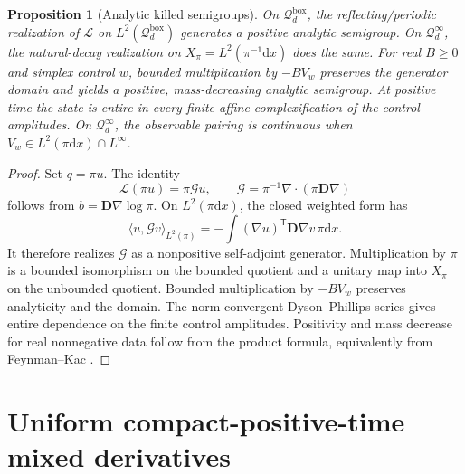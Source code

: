 \documentclass[aps,physrev,onecolumn,amsmath,amssymb,longbibliography]{revtex4-2}
\newcommand{\dd}{\mathrm d}
\newcommand{\Lfree}{\mathcal L}
\newcommand{\Qbox}{\mathcal Q_d^{\mathrm{box}}}
\newcommand{\Qinf}{\mathcal Q_d^{\infty}}
\newtheorem{proposition}[theorem]{Proposition}
\begin{document}
\begin{proposition}[Analytic killed semigroups]
\label{prop:supp-analytic}
On \(\Qbox\), the reflecting/periodic realization of \(\Lfree\) on
\(L^2(\Qbox)\) generates a positive analytic semigroup.  On \(\Qinf\), the
natural-decay realization on \(X_\pi=L^2(\pi^{-1}\dd x)\) does the same.
For real \(B\ge0\) and simplex control \(w\), bounded multiplication by
\(-BV_w\) preserves the generator domain and yields a positive,
mass-decreasing analytic semigroup.  At positive time the state is entire in
every finite affine complexification of the control amplitudes.  On
\(\Qinf\), the observable pairing is continuous when
\(V_w\in L^2(\pi\dd x)\cap L^\infty\).
\end{proposition}

\begin{proof}
Set \(q=\pi u\).  The identity
\begin{equation}
 \Lfree(\pi u)=\pi\mathcal Gu,\qquad
 \mathcal G=\pi^{-1}\nabla\!\cdot(\pi\bm D\nabla)
 \label{eq:supp-similarity}
\end{equation}
follows from \(b=\bm D\nabla\log\pi\).  On \(L^2(\pi\dd x)\), the closed
weighted form has
\begin{equation}
 \langle u,\mathcal Gv\rangle_{L^2(\pi)}
 =-\int(\nabla u)^{\mathsf T}\bm D\nabla v\,\pi\dd x.
 \label{eq:supp-form}
\end{equation}
It therefore realizes \(\mathcal G\) as a nonpositive self-adjoint generator.
Multiplication by \(\pi\) is a bounded isomorphism on the bounded quotient and
a unitary map into \(X_\pi\) on the unbounded quotient.  Bounded multiplication
by \(-BV_w\) preserves analyticity and the domain.  The norm-convergent
Dyson--Phillips series gives entire dependence on the finite control
amplitudes.  Positivity and mass decrease for real nonnegative data follow
from the product formula, equivalently from Feynman--Kac
\cite{bressloff2022feynmanKac,grebenkov2020multiple}.
\end{proof}

\section{Uniform compact-positive-time mixed derivatives}
\label{sec:supp-mixed}
\end{document}
